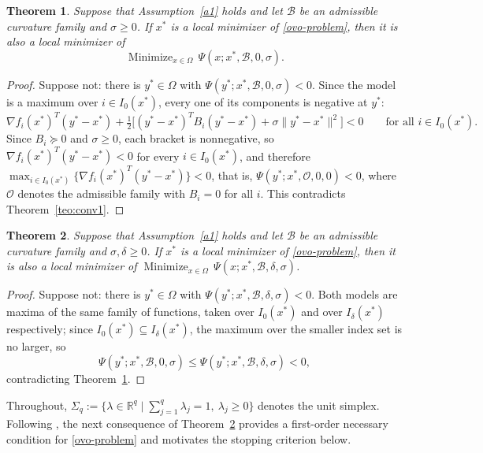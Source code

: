 \documentclass[11pt]{article}
\newcommand{\minimize}{\mathop{\text{Minimize}}}
\newtheorem{theorem}{Theorem}[section]
\begin{document}
\begin{theorem} \label{teo:conv2}
Suppose that Assumption~\ref{a1} holds and let $\mathcal{B}$ be an admissible
curvature family and $\sigma \geq 0$. If $x^*$ is a local minimizer of
\eqref{ovo-problem}, then it is also a local minimizer of
\[
\minimize_{x \in \Omega}\, \Psi(x; x^*, \mathcal{B}, 0, \sigma).
\]
\end{theorem}

\begin{proof}
Suppose not: there is $y^* \in \Omega$ with
$\Psi(y^*; x^*, \mathcal{B}, 0, \sigma) < 0$. Since the model is a maximum over
$i \in I_0(x^*)$, every one of its components is negative at $y^*$:
\[
\nabla f_i(x^*)^T(y^* - x^*)
+ \tfrac{1}{2} \big[ (y^* - x^*)^T B_i (y^* - x^*) + \sigma \|y^* - x^*\|^2 \big]
< 0 \qquad \text{for all } i \in I_0(x^*).
\]
Since $B_i \succeq 0$ and $\sigma \geq 0$, each bracket is nonnegative, so
$\nabla f_i(x^*)^T(y^* - x^*) < 0$ for every $i \in I_0(x^*)$, and therefore
$\max_{i \in I_0(x^*)} \{ \nabla f_i(x^*)^T(y^* - x^*) \} < 0$, that is,
$\Psi(y^*; x^*, \mathcal{O}, 0, 0) < 0$, where $\mathcal{O}$ denotes the
admissible family with $B_i = 0$ for all $i$. This contradicts
Theorem~\ref{teo:conv1}.
\end{proof}

\begin{theorem} \label{teo:conv3}
Suppose that Assumption~\ref{a1} holds and let $\mathcal{B}$ be an admissible
curvature family and $\sigma, \delta \geq 0$. If $x^*$ is a local minimizer of
\eqref{ovo-problem}, then it is also a local minimizer of
$\minimize_{x \in \Omega}\, \Psi(x; x^*, \mathcal{B}, \delta, \sigma)$.
\end{theorem}

\begin{proof}
Suppose not: there is $y^* \in \Omega$ with
$\Psi(y^*; x^*, \mathcal{B}, \delta, \sigma) < 0$. Both models are maxima of the
same family of functions, taken over $I_0(x^*)$ and over $I_\delta(x^*)$
respectively; since $I_0(x^*) \subseteq I_\delta(x^*)$, the maximum over the
smaller index set is no larger, so
\[
\Psi(y^*; x^*, \mathcal{B}, 0, \sigma)
\leq \Psi(y^*; x^*, \mathcal{B}, \delta, \sigma) < 0,
\]
contradicting Theorem~\ref{teo:conv2}.
\end{proof}

Throughout, $\Sigma_q := \{ \lambda \in \mathbb{R}^q \mid
\sum_{j=1}^q \lambda_j = 1,\ \lambda_j \geq 0 \}$ denotes the unit simplex.
Following \cite{alvarezovo}, the next consequence of Theorem~\ref{teo:conv3}
provides a first-order necessary condition for \eqref{ovo-problem} and
motivates the stopping criterion below.
\end{document}
